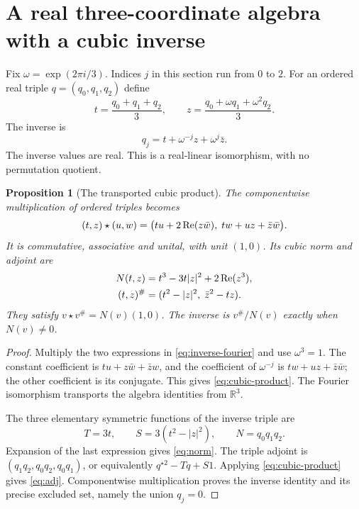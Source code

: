 \documentclass[11pt]{article}
\newtheorem{proposition}[theorem]{Proposition}
\theoremstyle{definition}\newtheorem{definition}[theorem]{Definition}
\newcommand{\R}{\mathbb R}\newcommand{\Q}{\mathbb Q}\newcommand{\Z}{\mathbb Z}
\begin{document}
\section{A real three-coordinate algebra with a cubic inverse}
Fix $\omega=\exp(2\pi i/3)$. Indices $j$ in this section run from $0$ to $2$.
For an ordered real triple $q=(q_0,q_1,q_2)$ define
\begin{equation}\label{eq:fourier}
 t=\frac{q_0+q_1+q_2}{3},\qquad
 z=\frac{q_0+\omega q_1+\omega^2q_2}{3}.
\end{equation}
The inverse is
\begin{equation}\label{eq:inverse-fourier}
 q_j=t+\omega^{-j}z+\omega^j\bar z.
\end{equation}
The inverse values are real. This is a real-linear isomorphism, with no permutation quotient.

\begin{proposition}[The transported cubic product]\label{prop:product}
The componentwise multiplication of ordered triples becomes
\begin{equation}\label{eq:cubic-product}
 (t,z)\star(u,w)=
 \bigl(tu+2\operatorname{Re}(z\bar w),\;tw+uz+\bar z\bar w\bigr).
\end{equation}
It is commutative, associative and unital, with unit $(1,0)$. Its cubic norm and adjoint are
\begin{align}\label{eq:norm}
 N(t,z)&=t^3-3t|z|^2+2\operatorname{Re}(z^3),\\
 (t,z)^\#&=(t^2-|z|^2,\;\bar z^2-tz).\label{eq:adj}
\end{align}
They satisfy $v\star v^\#=N(v)(1,0)$. The inverse is $v^\#/N(v)$ exactly when $N(v)\ne0$.
\end{proposition}
\begin{proof}
Multiply the two expressions in \eqref{eq:inverse-fourier} and use $\omega^3=1$. The constant coefficient is $tu+z\bar w+\bar zw$, and the coefficient of $\omega^{-j}$ is $tw+uz+\bar z\bar w$; the other coefficient is its conjugate. This gives \eqref{eq:cubic-product}. The Fourier isomorphism transports the algebra identities from $\R^3$.

The three elementary symmetric functions of the inverse triple are
\begin{equation}\label{eq:elementary}
 T=3t,\qquad S=3(t^2-|z|^2),\qquad N=q_0q_1q_2.
\end{equation}
Expansion of the last expression gives \eqref{eq:norm}. The triple adjoint is $(q_1q_2,q_0q_2,q_0q_1)$, or equivalently $q^{\star2}-Tq+S1$. Applying \eqref{eq:cubic-product} gives \eqref{eq:adj}. Componentwise multiplication proves the inverse identity and its precise excluded set, namely the union $q_j=0$.
\end{proof}
\end{document}
